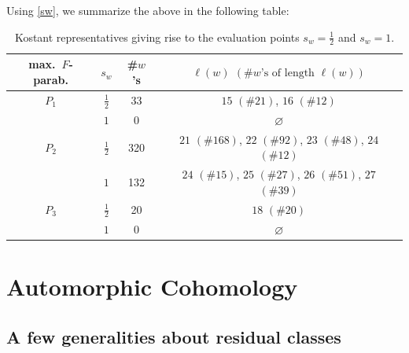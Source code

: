 \documentclass[a4paper,10pt]{amsart}
\theoremstyle{definition}
\numberwithin{equation}{section}
\begin{document}
\noindent Using \eqref{sw}, we summarize the above in the following table:
\small
\begin{table}[htbp]
\raggedright
\begin{tabular}{c c c c}
\toprule
max.\ $F$-parab. & $s_w$ & \#$w$'s & $\ell(w)$ $(\#w\text{'s of length }\ell(w))$\\
\midrule
$P_1$ & $\tfrac12$ & 33 & $15$ $(\#21)$, $16$ $(\#12)$ \\
& $1$ & 0 & $\varnothing$ \\ 
\midrule
$P_2$ & $\tfrac12$ & 320 & $21$ $(\#168)$, $22$ $(\#92)$, $23$ $(\#48)$, $24$ $(\#12)$ \\
& $1$ & 132 & $24$ $(\#15)$, $25$ $(\#27)$, $26$ $(\#51)$, $27$ $(\#39)$ \\ 
\midrule
$P_3$ & $\tfrac12$ & 20 & $18$ $(\#20)$ \\
& $1$ & 0 & $\varnothing$ \\
\bottomrule
\end{tabular}
\caption{\small Kostant representatives giving rise to the evaluation points \(s_w=\tfrac12\) and \(s_w=1\).}
\label{tab:kostant-representatives-evaluation-points}
\end{table}

\FloatBarrier
\normalsize

\section{Automorphic Cohomology}

\subsection{A few generalities about residual classes}\label{sect:residualclasses}
\end{document}
